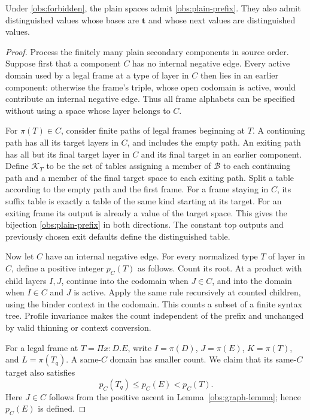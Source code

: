 \begin{lemma}\label{obs:plain-construction}
Under \eqref{obs:forbidden}, the plain spaces admit
\eqref{obs:plain-prefix}.  They also admit distinguished values whose
bases are $\mathbf t$ and whose next values are distinguished values.
\end{lemma}
\begin{proof}
Process the finitely many plain secondary components in source order.
Suppose first that a component $C$ has no internal negative edge.
Every active domain used by a legal frame at a type of layer in $C$
then lies in an earlier component: otherwise the frame's triple, whose
open codomain is active, would contribute an internal negative edge.
Thus all frame alphabets can be specified without using a space whose
layer belongs to $C$.

For $\pi(T)\in C$, consider finite paths of legal frames beginning at
$T$.  A continuing path has all its target layers in $C$, and includes
the empty path.  An exiting path has all but its final target layer in
$C$ and its final target in an earlier component.  Define $\mathcal K_T$
to be the set of tables assigning a member of $\mathcal B$ to each
continuing path and a member of the final target space to each exiting
path.  Split a table according to the empty path and the first frame.
For a frame staying in $C$, its suffix table is exactly a table of the
same kind starting at its target.  For an exiting frame its output is
already a value of the target space.  This gives the bijection
\eqref{obs:plain-prefix} in both directions.  The constant top outputs
and previously chosen exit defaults define the distinguished table.

Now let $C$ have an internal negative edge.  For every normalized type
$T$ of layer in $C$, define a positive integer $p_C(T)$ as follows.
Count its root.  At a product with child layers $I,J$, continue into
the codomain when $J\in C$, and into the domain when $I\in C$ and
$J$ is active.  Apply the same rule recursively at counted children,
using the binder context in the codomain.  This counts a subset of a
finite syntax tree.  Profile invariance makes the count independent of
the prefix and unchanged by valid thinning or context conversion.

For a legal frame at $T=\Pi x:D.E$, write
$I=\pi(D)$, $J=\pi(E)$, $K=\pi(T)$, and $L=\pi(T_q)$.
A same-$C$ domain has smaller count.  We claim
that its same-$C$ target also satisfies
\begin{equation}\label{obs:potential-drop}
               p_C(T_q)\le p_C(E)<p_C(T).
\end{equation}
Here $J\in C$ follows from the positive ascent in
Lemma~\ref{obs:graph-lemma}; hence $p_C(E)$ is defined.


\end{proof}

